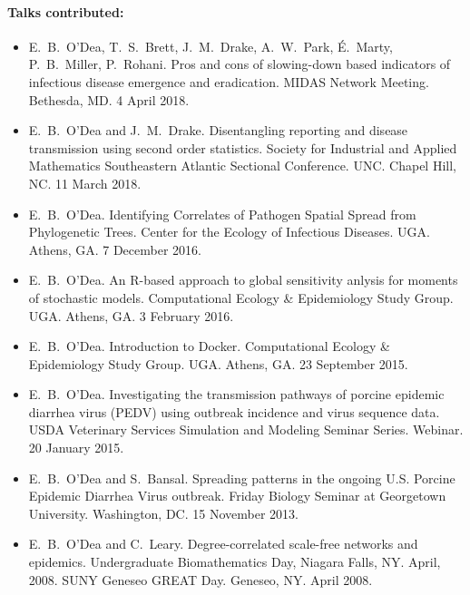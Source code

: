 \documentclass[a4paper]{article}
\begin{document}
\paragraph{Talks contributed:}
\begin{itemize}
\item[~] E.\ B.\ O'Dea, T.\ S.\ Brett, J.\ M.\ Drake, A.\ W.\ Park,
  \'{E}.\ Marty, P.\ B.\ Miller, P.\ Rohani. Pros and cons of
  slowing-down based indicators of infectious disease emergence and
  eradication. MIDAS Network Meeting. Bethesda, MD. 4 April 2018.
\item[~] E.\ B.\ O'Dea and J.\ M.\ Drake. Disentangling reporting and
  disease transmission using second order statistics. Society for
  Industrial and Applied Mathematics Southeastern Atlantic Sectional
  Conference. UNC. Chapel Hill, NC. 11 March 2018.
\item[~] E.\ B.\ O'Dea. Identifying Correlates of Pathogen Spatial
  Spread from Phylogenetic Trees. Center for the Ecology of Infectious
  Diseases. UGA. Athens, GA. 7 December 2016.
\item[~] E.\ B.\ O'Dea. An R-based approach to global sensitivity
  anlysis for moments of stochastic models. Computational Ecology
  \& Epidemiology Study Group. UGA. Athens, GA. 3 February 2016.
\item[~] E.\ B.\ O'Dea. Introduction to Docker. Computational Ecology
  \& Epidemiology Study Group. UGA. Athens, GA. 23 September 2015.
\item[~] E.\ B.\ O'Dea. Investigating the transmission pathways of
  porcine epidemic diarrhea virus (PEDV) using outbreak incidence and
  virus sequence data. USDA Veterinary Services Simulation and
  Modeling Seminar Series. Webinar. 20 January 2015.
\item[~] E.\ B.\ O'Dea and S.\ Bansal. Spreading patterns in the
  ongoing U.S. Porcine Epidemic Diarrhea Virus outbreak. Friday
  Biology Seminar at Georgetown University. Washington, DC. 15
  November 2013.
\item[~] E.\ B.\ O'Dea and C.\ Leary. Degree-correlated scale-free
  networks and epidemics.  Undergraduate Biomathematics Day, Niagara
  Falls, NY. April, 2008. SUNY Geneseo GREAT Day. Geneseo, NY. April
  2008.
\end{itemize}
\end{document}
